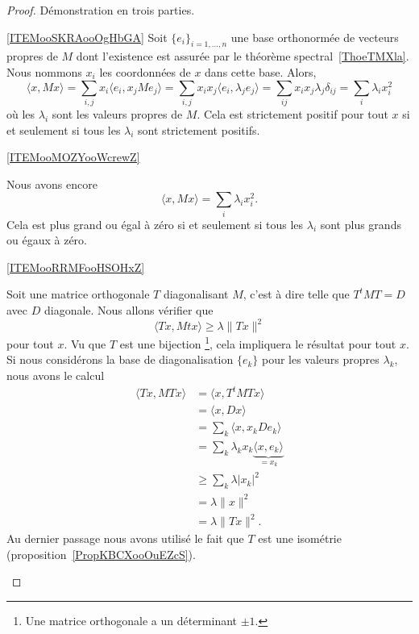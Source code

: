 \begin{proof}
    Démonstration en trois parties.
    \begin{subproof}
    \item[\ref{ITEMooSKRAooOgHbGA}]
    Soit \( \{ e_i \}_{i=1,\ldots, n}\) une base orthonormée de vecteurs propres de \( M\) dont l'existence est assurée par le théorème spectral~\ref{ThoeTMXla}. Nous nommons \( x_i\) les coordonnées de \( x\) dans cette base. Alors,
    \begin{equation}
        \langle x,Mx \rangle =\sum_{i,j}x_i\langle e_i, x_jMe_j\rangle =\sum_{i,j}x_ix_j\langle e_i, \lambda_je_j\rangle =\sum_{ij}x_ix_j\lambda_j\delta_{ij}=\sum_i\lambda_ix_i^2
    \end{equation}
    où les \( \lambda_i\) sont les valeurs propres de \( M\). Cela est strictement positif pour tout \( x\) si et seulement si tous les \( \lambda_i\) sont strictement positifs.
\item[\ref{ITEMooMOZYooWcrewZ}]

    Nous avons encore
    \begin{equation}
        \langle x, Mx\rangle =\sum_{i}\lambda_ix_i^2.
    \end{equation}
    Cela est plus grand ou égal à zéro si et seulement si tous les \( \lambda_i\) sont plus grands ou égaux à zéro.

\item[\ref{ITEMooRRMFooHSOHxZ}]

        Soit une matrice orthogonale \( T\) diagonalisant \( M\), c'est à dire telle que \( T^tMT=D\) avec \( D\) diagonale. Nous allons vérifier que
        \begin{equation}
            \langle Tx, Mtx\rangle \geq \lambda\| Tx \|^2
        \end{equation}
        pour tout \( x\). Vu que \( T\) est une bijection \footnote{Une matrice orthogonale a un déterminant $\pm 1$.}, cela impliquera le résultat pour tout \( x\). Si nous considérons la base de diagonalisation \( \{ e_k \}\) pour les valeurs propres \( \lambda_k\), nous avons le calcul
       \begin{subequations}
            \begin{align}
                \langle Tx, MTx\rangle &=\langle x, T^tMTx\rangle \\
                &=\langle x, Dx\rangle \\
                &=\sum_k\langle x, x_kDe_k\rangle \\
                &=\sum_k\lambda_kx_k \underbrace{\langle x, e_k\rangle }_{=x_k}\\
                &\geq \sum_k\lambda| x_k |^2\\
                &=\lambda\| x \|^2\\
                &=\lambda\| Tx \|^2.
            \end{align}
        \end{subequations}
        Au dernier passage nous avons utilisé le fait que \( T\) est une isométrie (proposition~\ref{PropKBCXooOuEZcS}).
    \end{subproof}
\end{proof}

